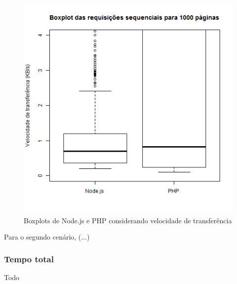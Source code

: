 \documentclass[conference,compsoc]{IEEEtran}
\begin{document}
\begin{figure}[h!]
\centering
  \includegraphics[scale=0.35]{plots/boxplots/concurrent/SPEED_DOWNLOAD/boxplot_SPEED_DOWNLOAD_1000_pages_processed_zoom_mean.png}
  \caption{Boxplots de Node.js e PHP considerando velocidade de transferência}
    \label{fig:boxplot_speed_download_concurrent_100_zoom}
\end{figure}

Para o segundo cenário, (...)


\subsubsection{Tempo total}
Todo

\end{document}
